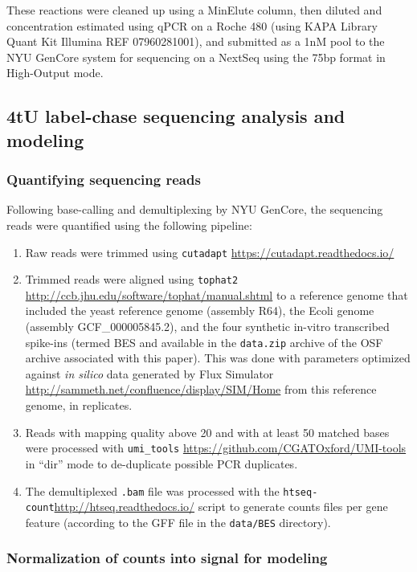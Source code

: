{These reactions were cleaned up using a MinElute column, then diluted
and concentration estimated using qPCR on a Roche 480 (using KAPA
Library Quant Kit Illumina REF 07960281001), and submitted as a 1nM pool
to the NYU GenCore system for sequencing on a NextSeq using the 75bp
format in High-Output mode.

\subsection{4tU label-chase sequencing analysis and modeling}

\subsubsection{Quantifying sequencing reads}

Following base-calling and demultiplexing by NYU GenCore, the sequencing
reads were quantified using the following pipeline:

\begin{enumerate}
  \setlength\itemsep{1em}
  \item Raw reads were trimmed using \texttt{cutadapt}
    \url{https://cutadapt.readthedocs.io/}
  \item Trimmed reads were aligned using \texttt{tophat2}
    \url{http://ccb.jhu.edu/software/tophat/manual.shtml}
    to a reference genome that included the yeast reference 
     genome (assembly R64), the Ecoli genome (assembly 
     GCF\_000005845.2), and the four synthetic in-vitro transcribed 
     spike-ins (termed BES and available in the \texttt{data.zip} 
     archive of the OSF archive associated with this paper). 
     This was done with parameters optimized 
     against \emph{in silico} data generated by Flux Simulator
     \url{http://sammeth.net/confluence/display/SIM/Home} from this 
     reference genome, in replicates.
  \item Reads with mapping quality above 20 and with at least 50 
     matched bases were processed with \texttt{umi\_tools}
     \url{https://github.com/CGATOxford/UMI-tools} in ``dir'' mode to
    de-duplicate possible PCR duplicates.
  \item The demultiplexed \texttt{.bam} file was processed with the
    \texttt{htseq-count}\url{http://htseq.readthedocs.io/}
    script to generate counts files per gene feature (according to 
    the GFF file in the \texttt{data/BES} directory).
\end{enumerate}

\subsubsection{Normalization of counts into signal for modeling}

}

